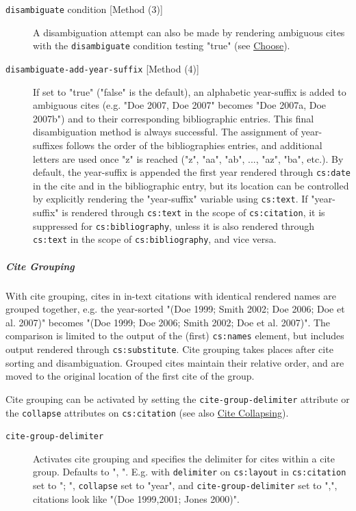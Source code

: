 \begin{description}
\item[\texttt{disambiguate} condition {[}Method (3){]}]
A disambiguation attempt can also be made by rendering ambiguous cites
with the \texttt{disambiguate} condition testing "true" (see
\protect\hyperlink{choose}{Choose}).
\item[\texttt{disambiguate-add-year-suffix} {[}Method (4){]}]
If set to "true" ("false" is the default), an alphabetic year-suffix is
added to ambiguous cites (e.g. "Doe 2007, Doe 2007" becomes "Doe 2007a,
Doe 2007b") and to their corresponding bibliographic entries. This final
disambiguation method is always successful. The assignment of
year-suffixes follows the order of the bibliographies entries, and
additional letters are used once "z" is reached ("z", "aa", "ab", ...,
"az", "ba", etc.). By default, the year-suffix is appended the first
year rendered through \texttt{cs:date} in the cite and in the
bibliographic entry, but its location can be controlled by explicitly
rendering the "year-suffix" variable using \texttt{cs:text}. If
"year-suffix" is rendered through \texttt{cs:text} in the scope of
\texttt{cs:citation}, it is suppressed for \texttt{cs:bibliography},
unless it is also rendered through \texttt{cs:text} in the scope of
\texttt{cs:bibliography}, and vice versa.
\end{description}

\hypertarget{cite-grouping}{%
\subparagraph{Cite Grouping}\label{cite-grouping}}

With cite grouping, cites in in-text citations with identical rendered
names are grouped together, e.g. the year-sorted "(Doe 1999; Smith 2002;
Doe 2006; Doe et al. 2007)" becomes "(Doe 1999; Doe 2006; Smith 2002;
Doe et al. 2007)". The comparison is limited to the output of the
(first) \texttt{cs:names} element, but includes output rendered through
\texttt{cs:substitute}. Cite grouping takes places after cite sorting
and disambiguation. Grouped cites maintain their relative order, and are
moved to the original location of the first cite of the group.

Cite grouping can be activated by setting the
\texttt{cite-group-delimiter} attribute or the \texttt{collapse}
attributes on \texttt{cs:citation} (see also
\protect\hyperlink{cite-collapsing}{Cite Collapsing}).

\begin{description}
\item[\texttt{cite-group-delimiter}]
Activates cite grouping and specifies the delimiter for cites within a
cite group. Defaults to ", ". E.g. with \texttt{delimiter} on
\texttt{cs:layout} in \texttt{cs:citation} set to "; ",
\texttt{collapse} set to "year", and \texttt{cite-group-delimiter} set
to ",", citations look like "(Doe 1999,2001; Jones 2000)".
\end{description}

